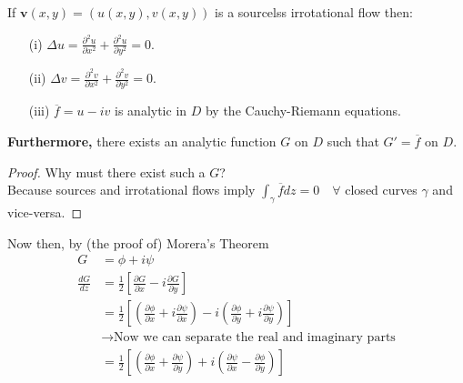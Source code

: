\begin{corollary}
    If $\mathbf{v}(x,y) = (u(x,y), v(x,y))$ is a sourcelss irrotational flow then:
    \begin{enumerate}
        \item[(i)] $\Delta u = \frac{\partial^2 u}{\partial x^2} + \frac{\partial^2 u}{\partial y^2} = 0$.
        \item[(ii)] $\Delta v = \frac{\partial^2 v}{\partial x^2} + \frac{\partial^2 v}{\partial y^2} = 0$.
        \item[(iii)] $\overline{f} = u - iv$ is analytic in $D$ by the Cauchy-Riemann equations.
    \end{enumerate}

    \textbf{Furthermore,} there exists an analytic function $G$ on $D$ such that $G' = \overline{f}$ on $D$.
    \begin{proof}
        Why must there exist such a $G$?\\
        Because sources and irrotational flows imply $\int_\gamma \overline{f} dz = 0 \quad \forall$ closed curves $\gamma$ and vice-versa.
    \end{proof}
    Now then, by (the proof of) Morera's Theorem
    \begin{align*}
        G                 & = \phi + i \psi                                                                                                                                                                                \\
        \frac{dG}{dz}     & = \frac{1}2\left[\frac{\partial G}{\partial x} - i\frac{\partial G}{\partial y}\right]                                                                                                         \\
                          & = \frac{1}2\left[\left(\frac{\partial \phi}{\partial x} + i\frac{\partial \psi}{\partial x}\right) - i\left(\frac{\partial \phi}{\partial y} + i\frac{\partial \psi}{\partial y}\right)\right] \\
                          & \rightarrow \text{Now we can separate the real and imaginary parts}                                                                                                                            \\
                          & = \frac{1}2\left[\left(\frac{\partial \phi}{\partial x} + \frac{\partial \psi}{\partial y}\right) + i\left(\frac{\partial \psi}{\partial x} - \frac{\partial \phi}{\partial y}\right)\right]   \\

\end{align*}
\end{corollary}
